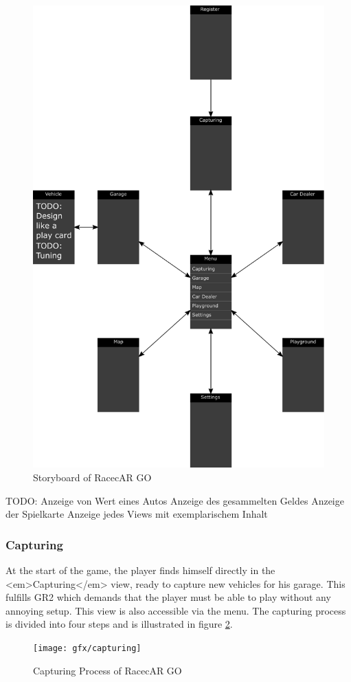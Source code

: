 \begin{figure}[bth]
  \centering
        \includegraphics[width=.75\linewidth]{gfx/storyboard}
        \caption{Storyboard of RacecAR GO}
        \label{fig:storyboard}
\end{figure}
TODO:
Anzeige von Wert eines Autos
Anzeige des gesammelten Geldes
Anzeige der Spielkarte
Anzeige jedes Views mit exemplarischem Inhalt

\subsubsection{Capturing}
At the start of the game, the player finds himself directly in the <em>Capturing</em> view, ready to capture new vehicles for his garage. This fulfills GR2 which demands that the player must be able to play without any annoying setup. This view is also accessible via the menu. The capturing process is divided into four steps and is illustrated in figure \ref{fig:capturing}.

\begin{figure}[bth]
  \centering
        \texttt{[image: gfx/capturing]}
        \caption{Capturing Process of RacecAR GO}
        \label{fig:capturing}
\end{figure}

